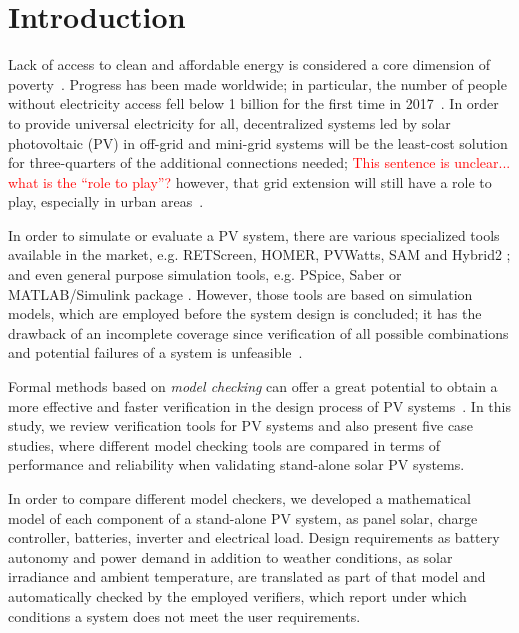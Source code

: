 \documentclass[runningheads]{llncs}
\begin{document}
\section{Introduction}

Lack of access to clean and affordable energy is considered a core dimension of poverty~\cite{Hussein2012}. Progress has been made worldwide; in particular, the number of people without electricity access fell below 1 billion for the first time in 2017~\cite{IEAweo2018}. In order to provide universal electricity for all, decentralized systems led by solar photovoltaic (PV) in off-grid and mini-grid systems will be the least-cost solution for three-quarters of the additional connections needed; \textcolor{red}{This sentence is unclear... what is the ``role to play''?} however, that grid extension will still have a role to play, especially in urban areas~\cite{IEAweo2018}.

In order to simulate or evaluate a PV system, there are various specialized tools available in the market, e.g. RETScreen, HOMER, PVWatts, SAM and Hybrid2 \cite{Pradhan,Swarnkar,NRELDobos,NRELBlair,Mills}; and even general purpose simulation tools, e.g. PSpice, Saber or MATLAB/Simulink package \cite{Gow1999,Benatiallah2017}. However, those tools are based on simulation models, which are employed before the system design is concluded; it has the drawback of an incomplete coverage since verification of all possible combinations and potential failures of a system is unfeasible~\cite{ClarkeHV18}.

Formal methods based on \textit{model checking} can offer a great potential to obtain a more effective and faster verification in the design process of PV systems~\cite{ClarkeHV18}. In this study, we review verification tools for PV systems and also present five case studies, where different model checking tools are compared in terms of performance and reliability when validating stand-alone solar PV systems. 

In order to compare different model checkers, we developed a mathematical model of each component of a stand-alone PV system, as panel solar, charge controller, batteries, inverter and electrical load. Design requirements as battery autonomy and power demand in addition to weather conditions, as solar irradiance and ambient temperature, are translated as part of that model and automatically checked by the employed verifiers, which report under which conditions a system does not meet the user requirements. 
\end{document}
